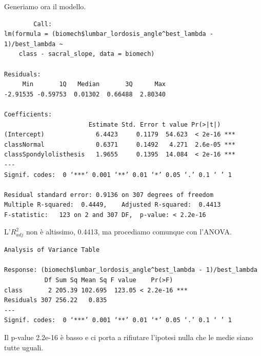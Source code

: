 \documentclass{beamer}
\newcommand{\fg}[2]{%
  \begin{center}
      \texttt{[image: \#2]}%
  \end{center}
}
\begin{document}
\begin{frame}[fragile]
	Generiamo ora il modello.
	{\tiny
	\begin{verbatim}
		Call:
lm(formula = (biomech$lumbar_lordosis_angle^best_lambda - 1)/best_lambda ~ 
    class - sacral_slope, data = biomech)

Residuals:
     Min       1Q   Median       3Q      Max 
-2.91535 -0.59753  0.01302  0.66488  2.80340 

Coefficients:
                       Estimate Std. Error t value Pr(>|t|)    
(Intercept)              6.4423     0.1179  54.623  < 2e-16 ***
classNormal              0.6371     0.1492   4.271  2.6e-05 ***
classSpondylolisthesis   1.9655     0.1395  14.084  < 2e-16 ***
---
Signif. codes:  0 ‘***’ 0.001 ‘**’ 0.01 ‘*’ 0.05 ‘.’ 0.1 ‘ ’ 1

Residual standard error: 0.9136 on 307 degrees of freedom
Multiple R-squared:  0.4449,	Adjusted R-squared:  0.4413 
F-statistic:   123 on 2 and 307 DF,  p-value: < 2.2e-16
	\end{verbatim}
	}
\end{frame}

\begin{frame}[fragile]
	L'$R^{2}_{adj}$ non è altissimo, 0.4413, ma procediamo comunque con l'ANOVA.

	{\tiny
	\begin{verbatim}
Analysis of Variance Table

Response: (biomech$lumbar_lordosis_angle^best_lambda - 1)/best_lambda
           Df Sum Sq Mean Sq F value    Pr(>F)    
class       2 205.39 102.695  123.05 < 2.2e-16 ***
Residuals 307 256.22   0.835                      
---
Signif. codes:  0 ‘***’ 0.001 ‘**’ 0.01 ‘*’ 0.05 ‘.’ 0.1 ‘ ’ 1
	\end{verbatim}
	}

	Il p-value 2.2e-16 è basso e ci porta a rifiutare l'ipotesi nulla che le medie siano tutte uguali.
\end{frame}


\end{document}
